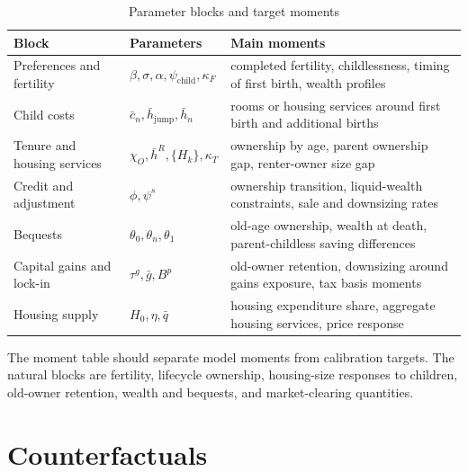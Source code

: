 \documentclass[11pt]{article}
\newcommand{\1}{\mathbf 1}
\begin{document}
\begin{table}[H]
\centering
\caption{Parameter blocks and target moments}
\small
\begin{tabularx}{\textwidth}{@{}l l X@{}}
\toprule
Block & Parameters & Main moments \\
\midrule
Preferences and fertility
& $\beta,\sigma,\alpha,\psi_{\mathrm{child}},\kappa_F$
& completed fertility, childlessness, timing of first birth, wealth profiles \\
Child costs
& $\bar c_n,\bar h_{\mathrm{jump}},\bar h_n$
& rooms or housing services around first birth and additional births \\
Tenure and housing services
& $\chi_O,\bar h^R,\{H_k\},\kappa_T$
& ownership by age, parent ownership gap, renter-owner size gap \\
Credit and adjustment
& $\phi,\psi^s$
& ownership transition, liquid-wealth constraints, sale and downsizing rates \\
Bequests
& $\theta_0,\theta_n,\theta_1$
& old-age ownership, wealth at death, parent-childless saving differences \\
Capital gains and lock-in
& $\tau^g,\bar g,B^p$
& old-owner retention, downsizing around gains exposure, tax basis moments \\
Housing supply
& $H_0,\eta,\bar q$
& housing expenditure share, aggregate housing services, price response \\
\bottomrule
\end{tabularx}
\end{table}

The moment table should separate model moments from calibration targets. The
natural blocks are fertility, lifecycle ownership, housing-size responses to
children, old-owner retention, wealth and bequests, and market-clearing
quantities.

\section{Counterfactuals}
\end{document}
